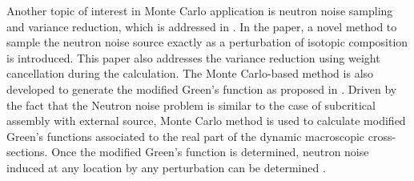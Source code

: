 Another topic of interest in Monte Carlo application is neutron noise sampling and variance reduction, which is addressed in \cite{belangerVarianceReductionNoise2022}. In the paper, a novel method to sample the neutron noise source exactly as a perturbation of isotopic composition is introduced. This paper also addresses the variance reduction using weight cancellation during the calculation. The Monte Carlo-based method is also developed to generate the modified Green’s function as proposed in \cite{demaziereMonteCarlobasedDynamic29}. Driven by the fact that the Neutron noise problem is similar to the case of subcritical assembly with external source, Monte Carlo method is used to calculate modified Green’s functions associated to the real part of the dynamic macroscopic cross-sections. Once the modified Green’s function is determined, neutron noise induced at any location by any perturbation can be determined \cite{demaziereMonteCarlobasedDynamic29}.
